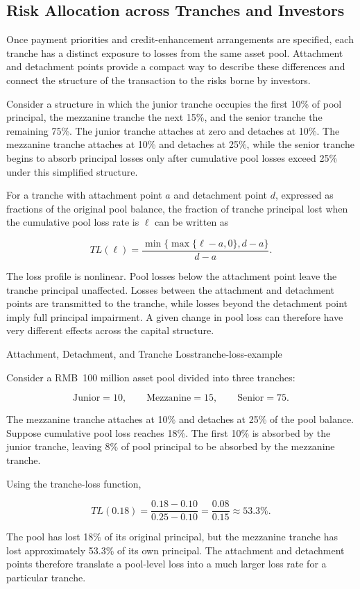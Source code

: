 \subsection{Risk Allocation across Tranches and Investors}

Once payment priorities and credit-enhancement arrangements are specified, each tranche has a distinct exposure to losses from the same asset pool. Attachment and detachment points provide a compact way to describe these differences and connect the structure of the transaction to the risks borne by investors.

Consider a structure in which the junior tranche occupies the first 10\% of pool principal, the mezzanine tranche the next 15\%, and the senior tranche the remaining 75\%. The junior tranche attaches at zero and detaches at 10\%. The mezzanine tranche attaches at 10\% and detaches at 25\%, while the senior tranche begins to absorb principal losses only after cumulative pool losses exceed 25\% under this simplified structure.

For a tranche with attachment point \(a\) and detachment point \(d\), expressed as fractions of the original pool balance, the fraction of tranche principal lost when the cumulative pool loss rate is \(\ell\) can be written as

\begin{equation}
TL(\ell)
=
\frac{
\min\{\max\{\ell-a,0\},d-a\}
}{
d-a
}.
\label{eq:ch20-tranche-loss-function}
\end{equation}

The loss profile is nonlinear. Pool losses below the attachment point leave the tranche principal unaffected. Losses between the attachment and detachment points are transmitted to the tranche, while losses beyond the detachment point imply full principal impairment. A given change in pool loss can therefore have very different effects across the capital structure.

\begin{example}{Attachment, Detachment, and Tranche Loss}{tranche-loss-example}

Consider a RMB~100 million asset pool divided into three tranches:

\[
\text{Junior}=10,\qquad
\text{Mezzanine}=15,\qquad
\text{Senior}=75.
\]

The mezzanine tranche attaches at 10\% and detaches at 25\% of the pool balance. Suppose cumulative pool loss reaches 18\%. The first 10\% is absorbed by the junior tranche, leaving 8\% of pool principal to be absorbed by the mezzanine tranche.

Using the tranche-loss function,

\[
TL(0.18)
=
\frac{0.18-0.10}{0.25-0.10}
=
\frac{0.08}{0.15}
\approx 53.3\%.
\]

The pool has lost 18\% of its original principal, but the mezzanine tranche has lost approximately 53.3\% of its own principal. The attachment and detachment points therefore translate a pool-level loss into a much larger loss rate for a particular tranche.

\end{example}

